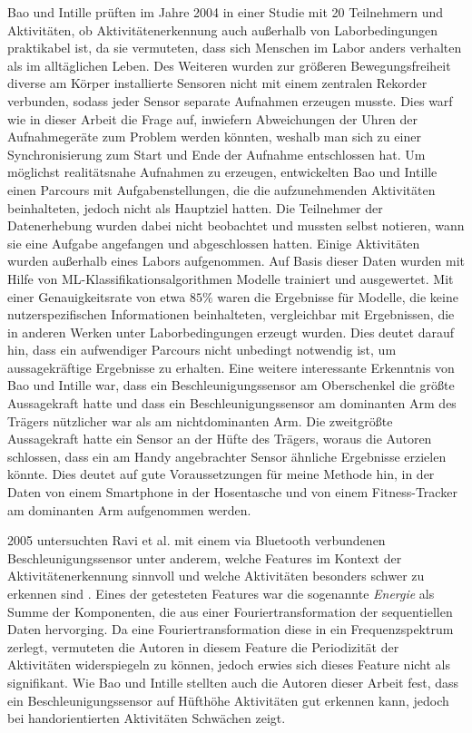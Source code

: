 Bao und Intille prüften im Jahre 2004 in einer Studie mit 20 Teilnehmern und Aktivitäten, ob Aktivitätenerkennung auch außerhalb von Laborbedingungen praktikabel ist, da sie vermuteten, dass sich Menschen im Labor anders verhalten als im alltäglichen Leben. Des Weiteren wurden zur größeren Bewegungsfreiheit diverse am Körper installierte Sensoren nicht mit einem zentralen Rekorder verbunden, sodass jeder Sensor separate Aufnahmen erzeugen musste. Dies warf wie in dieser Arbeit die Frage auf, inwiefern Abweichungen der Uhren der Aufnahmegeräte zum Problem werden könnten, weshalb man sich zu einer Synchronisierung zum Start und Ende der Aufnahme entschlossen hat.
Um möglichst realitätsnahe Aufnahmen zu erzeugen, entwickelten Bao und Intille einen Parcours mit Aufgabenstellungen, die die aufzunehmenden Aktivitäten beinhalteten, jedoch nicht als Hauptziel hatten. Die Teilnehmer der Datenerhebung wurden dabei nicht beobachtet und mussten selbst notieren, wann sie eine Aufgabe angefangen und abgeschlossen hatten. Einige Aktivitäten wurden außerhalb eines Labors aufgenommen. Auf Basis dieser Daten wurden mit Hilfe von \ac{ML}-Klassifikationsalgorithmen Modelle trainiert und ausgewertet. Mit einer Genauigkeitsrate von etwa $85 \%$ waren die Ergebnisse für Modelle, die keine nutzerspezifischen Informationen beinhalteten, vergleichbar mit Ergebnissen, die in anderen Werken unter Laborbedingungen erzeugt wurden. Dies deutet darauf hin, dass ein aufwendiger Parcours nicht unbedingt notwendig ist, um aussagekräftige Ergebnisse zu erhalten.
Eine weitere interessante Erkenntnis von Bao und Intille war, dass ein Beschleunigungssensor am Oberschenkel die größte Aussagekraft hatte und dass ein Beschleunigungssensor am dominanten Arm des Trägers nützlicher war als am nichtdominanten Arm. Die zweitgrößte Aussagekraft hatte ein Sensor an der Hüfte des Trägers, woraus die Autoren schlossen, dass ein am Handy angebrachter Sensor ähnliche Ergebnisse erzielen könnte. Dies deutet auf gute Voraussetzungen für meine Methode hin, in der Daten von einem Smartphone in der Hosentasche und von einem Fitness-Tracker am dominanten Arm aufgenommen werden.

2005 untersuchten Ravi et al. mit einem via Bluetooth verbundenen Beschleunigungssensor unter anderem, welche Features im Kontext der Aktivitätenerkennung sinnvoll und welche Aktivitäten besonders schwer zu erkennen sind \cite{Ravi2005}. Eines der getesteten Features war die sogenannte \textit{Energie} als Summe der Komponenten, die aus einer Fouriertransformation der sequentiellen Daten hervorging. Da eine Fouriertransformation diese in ein Frequenzspektrum zerlegt, vermuteten die Autoren in diesem Feature die Periodizität der Aktivitäten widerspiegeln zu können, jedoch erwies sich dieses Feature nicht als signifikant. Wie Bao und Intille stellten auch die Autoren dieser Arbeit fest, dass ein Beschleunigungssensor auf Hüfthöhe Aktivitäten gut erkennen kann, jedoch bei handorientierten Aktivitäten Schwächen zeigt.

